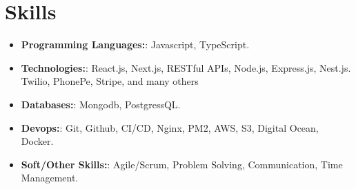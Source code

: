 \documentclass[letterpaper,11pt]{article}
\newcommand{\resumeItem}[2]{
  \item\small{
    \textbf{#1}{: #2 \vspace{-2pt}}
  }
}
\newcommand{\resumeSubItem}[2]{\resumeItem{#1}{#2}\vspace{-4pt}}
\newcommand{\resumeSubHeadingListStart}{\begin{itemize}[leftmargin=*]}
\newcommand{\resumeSubHeadingListEnd}{\end{itemize}}
\begin{document}
%
\section{Skills}
 \resumeSubHeadingListStart
    \resumeSubItem{Programming Languages:} {Javascript, TypeScript.}
    \resumeSubItem{Technologies:} {React.js, Next.js, RESTful APIs, Node.js, Express.js, Nest.js. Twilio, PhonePe, Stripe, and many others}
    \resumeSubItem{Databases:} {Mongodb, PostgressQL.}
    \resumeSubItem{Devops:} {Git, Github, CI/CD, Nginx, PM2, AWS, S3, Digital Ocean, Docker.}
    \resumeSubItem{Soft/Other Skills:} {Agile/Scrum, Problem Solving, Communication, Time Management.}
 \resumeSubHeadingListEnd

\end{document}
